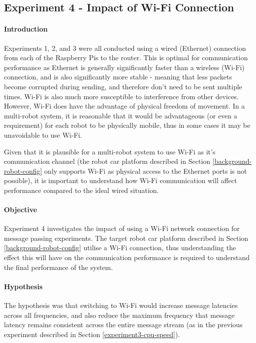 \documentclass[../dissertation.tex]{subfiles}
\begin{document}
\subsection{Experiment 4 - Impact of Wi-Fi Connection}
\label{exp-4}

\paragraph{Introduction} Experiments 1, 2, and 3 were all conducted using a wired (Ethernet) connection from each of the Raspberry Pis to the router. This is optimal for communication performance as Ethernet is generally significantly faster than a wireless (Wi-Fi) connection, and is also significantly more stable - meaning that less packets become corrupted during sending, and therefore don't need to be sent multiple times. Wi-Fi is also much more susceptible to interference from other devices. However, Wi-Fi does have the advantage of physical freedom of movement. In a multi-robot system, it is reasonable that it would be advantageous (or even a requirement) for each robot to be physically mobile, thus in some cases it may be unavoidable to use Wi-Fi.

Given that it is plausible for a multi-robot system to use Wi-Fi as it's communication channel (the robot car platform described in Section \ref{background-robot-config} only supports Wi-Fi as physical access to the Ethernet ports is not possible), it is important to understand how Wi-Fi communication will affect performance compared to the ideal wired situation.

\paragraph{Objective} Experiment 4 investigates the impact of using a Wi-Fi network connection for message passing experiments. The target robot car platform described in Section \ref{background-robot-config} utilise a Wi-Fi connection, thus understanding the effect this will have on the communication performance is required to understand the final performance of the system.

\paragraph{Hypothesis} The hypothesis was that switching to Wi-Fi would increase message latencies across all frequencies, and also reduce the maximum frequency that message latency remains consistent across the entire message stream (as in the previous experiment described in Section \ref{experiment3-cpu-speed}).
\end{document}
